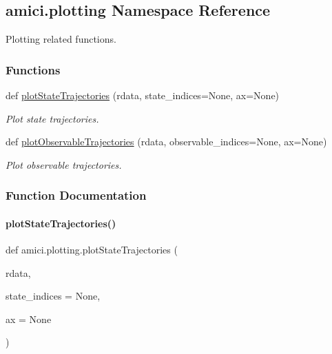 \hypertarget{namespaceamici_1_1plotting}{}\subsection{amici.\+plotting Namespace Reference}
\label{namespaceamici_1_1plotting}


Plotting related functions.  


\subsubsection*{Functions}
\begin{DoxyCompactItemize}
\item 
def \mbox{\hyperlink{namespaceamici_1_1plotting_acd5cb5084b075aa388dc43b9bb3c89a6}{plot\+State\+Trajectories}} (rdata, state\+\_\+indices=None, ax=None)
\begin{DoxyCompactList}\small\item\em Plot state trajectories. \end{DoxyCompactList}\item 
def \mbox{\hyperlink{namespaceamici_1_1plotting_aad83ff2d2783fe975309f8d129ad0f3b}{plot\+Observable\+Trajectories}} (rdata, observable\+\_\+indices=None, ax=None)
\begin{DoxyCompactList}\small\item\em Plot observable trajectories. \end{DoxyCompactList}\end{DoxyCompactItemize}


\subsubsection{Function Documentation}
\mbox{\label{namespaceamici_1_1plotting_acd5cb5084b075aa388dc43b9bb3c89a6}} 
\paragraph{\texorpdfstring{plotStateTrajectories()}{plotStateTrajectories()}}
{\footnotesize\ttfamily def amici.\+plotting.\+plot\+State\+Trajectories (\begin{DoxyParamCaption}\item[{}]{rdata,  }\item[{}]{state\+\_\+indices = {\ttfamily None},  }\item[{}]{ax = {\ttfamily None} }\end{DoxyParamCaption})}


